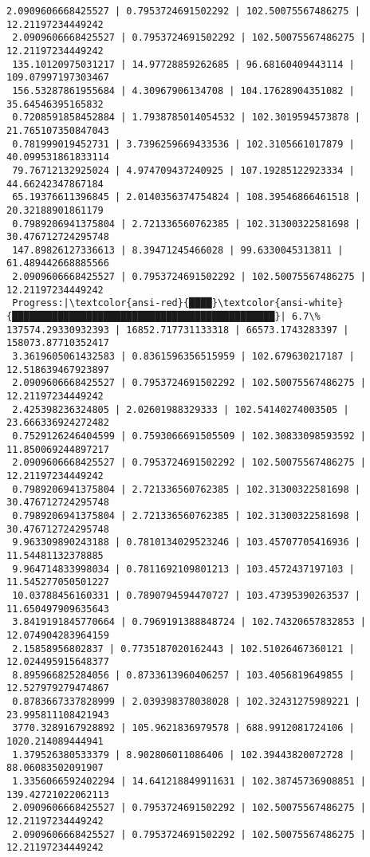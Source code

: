 \documentclass[11pt]{article}
\begin{document}
\begin{Verbatim}[commandchars=\\\{\}]
 2.0909606668425527 | 0.7953724691502292 | 102.50075567486275 | 12.21197234449242
 2.0909606668425527 | 0.7953724691502292 | 102.50075567486275 | 12.21197234449242
 135.10120975031217 | 14.97728859262685 | 96.68160409443114 | 109.07997197303467
 156.53287861955684 | 4.30967906134708 | 104.17628904351082 | 35.64546395165832
 0.7208591858452884 | 1.7938785014054532 | 102.3019594573878 | 21.765107350847043
 0.781999019452731 | 3.7396259669433536 | 102.3105661017879 | 40.099531861833114
 79.76712132925024 | 4.974709437240925 | 107.19285122923334 | 44.66242347867184
 65.19376611396845 | 2.0140356374754824 | 108.39546866461518 | 20.32188901861179
 0.7989206941375804 | 2.721336560762385 | 102.31300322581698 | 30.476712724295748
 147.89826127336613 | 8.39471245466028 | 99.6330045313811 | 61.489442668885566
 2.0909606668425527 | 0.7953724691502292 | 102.50075567486275 | 12.21197234449242
 Progress:|\textcolor{ansi-red}{████}\textcolor{ansi-white}{██████████████████████████████████████████████}| 6.7\% 137574.29330932393 | 16852.717731133318 | 66573.1743283397 | 158073.87710352417
 3.3619605061432583 | 0.8361596356515959 | 102.679630217187 | 12.518639467923897
 2.0909606668425527 | 0.7953724691502292 | 102.50075567486275 | 12.21197234449242
 2.425398236324805 | 2.02601988329333 | 102.54140274003505 | 23.666336924272482
 0.7529126246404599 | 0.7593066691505509 | 102.30833098593592 | 11.850069244897217
 2.0909606668425527 | 0.7953724691502292 | 102.50075567486275 | 12.21197234449242
 0.7989206941375804 | 2.721336560762385 | 102.31300322581698 | 30.476712724295748
 0.7989206941375804 | 2.721336560762385 | 102.31300322581698 | 30.476712724295748
 9.963309890243188 | 0.7810134029523246 | 103.45707705416936 | 11.54481132378885
 9.964714833998034 | 0.7811692109801213 | 103.4572437197103 | 11.545277050501227
 10.03788456160331 | 0.7890794594470727 | 103.47395390263537 | 11.650497909635643
 3.8419191845770664 | 0.7969191388848724 | 102.74320657832853 | 12.074904283964159
 2.15858956802837 | 0.7735187020162443 | 102.51026467360121 | 12.024495915648377
 8.895966825284056 | 0.8733613960406257 | 103.4056819649855 | 12.527979279474867
 0.8783667337828999 | 2.039398378038028 | 102.32431275989221 | 23.995811108421943
 3770.3289167928892 | 105.9621836979578 | 688.9912081724106 | 1020.214089444941
 1.379526380533379 | 8.902806011086406 | 102.39443820072728 | 88.06083502091907
 1.3356066592402294 | 14.641218849911631 | 102.38745736908851 | 139.42721022062113
 2.0909606668425527 | 0.7953724691502292 | 102.50075567486275 | 12.21197234449242
 2.0909606668425527 | 0.7953724691502292 | 102.50075567486275 | 12.21197234449242

\end{Verbatim}
\end{document}
